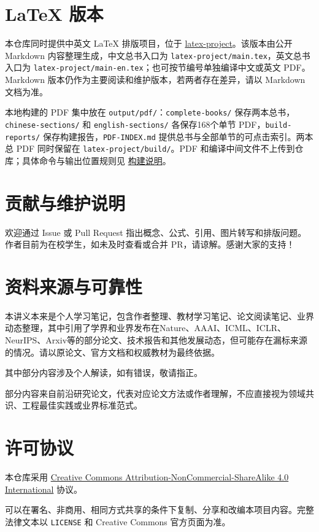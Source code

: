 \hypertarget{latex-ux7248ux672c}{%
\section{LaTeX 版本}\label{latex-ux7248ux672c}}

本仓库同时提供中英文 LaTeX 排版项目，位于 \href{latex-project/README.md}{latex-project}。该版本由公开 Markdown 内容整理生成，中文总书入口为 \texttt{latex-project/main.tex}，英文总书入口为 \texttt{latex-project/main-en.tex}；也可按节编号单独编译中文或英文 PDF。Markdown 版本仍作为主要阅读和维护版本，若两者存在差异，请以 Markdown 文档为准。

本地构建的 PDF 集中放在 \texttt{output/pdf/}：\texttt{complete-books/} 保存两本总书，\texttt{chinese-sections/} 和 \texttt{english-sections/} 各保存168个单节 PDF，\texttt{build-reports/} 保存构建报告，\texttt{PDF-INDEX.md} 提供总书与全部单节的可点击索引。两本总 PDF 同时保留在 \texttt{latex-project/build/}。PDF 和编译中间文件不上传到仓库；具体命令与输出位置规则见 \href{latex-project/README.md}{构建说明}。

\hypertarget{ux8d21ux732eux4e0eux7ef4ux62a4ux8bf4ux660e}{%
\section{贡献与维护说明}\label{ux8d21ux732eux4e0eux7ef4ux62a4ux8bf4ux660e}}

欢迎通过 Issue 或 Pull Request 指出概念、公式、引用、图片转写和排版问题。作者目前为在校学生，如未及时查看或合并 PR，请谅解。感谢大家的支持！

\hypertarget{ux8d44ux6599ux6765ux6e90ux4e0eux53efux9760ux6027}{%
\section{资料来源与可靠性}\label{ux8d44ux6599ux6765ux6e90ux4e0eux53efux9760ux6027}}

本讲义本来是个人学习笔记，包含作者整理、教材学习笔记、论文阅读笔记、业界动态整理，其中引用了学界和业界发布在Nature、AAAI、ICML、ICLR、NeurIPS、Arxiv等的部分论文、技术报告和其他发展动态，但可能存在漏标来源的情况。请以原论文、官方文档和权威教材为最终依据。

其中部分内容涉及个人解读，如有错误，敬请指正。

部分内容来自前沿研究论文，代表对应论文方法或作者理解，不应直接视为领域共识、工程最佳实践或业界标准范式。

\hypertarget{ux8bb8ux53efux534fux8bae}{%
\section{许可协议}\label{ux8bb8ux53efux534fux8bae}}

本仓库采用 \href{https://creativecommons.org/licenses/by-nc-sa/4.0/}{Creative Commons Attribution-NonCommercial-ShareAlike 4.0 International} 协议。

可以在署名、非商用、相同方式共享的条件下复制、分享和改编本项目内容。完整法律文本以 \texttt{LICENSE} 和 Creative Commons 官方页面为准。

\clearpage
